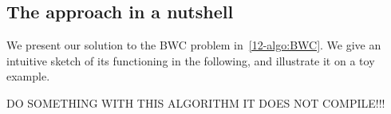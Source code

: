\subsection{The approach in a nutshell}
We present our solution to the BWC problem in~\cref{12-algo:BWC}. We give an intuitive sketch of its functioning in the following, and illustrate it on a toy example. 

DO SOMETHING WITH THIS ALGORITHM IT DOES NOT COMPILE!!!


